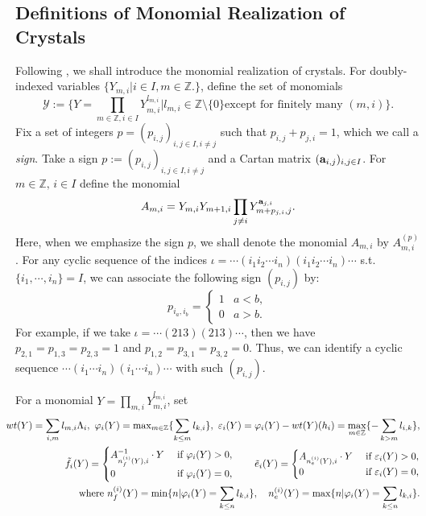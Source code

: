 \subsection{Definitions of Monomial Realization of Crystals}
\label{mono-subsec}
Following \cite{K7,Nj}, 
we shall introduce the monomial realization of crystals.
For doubly-indexed variables $\{Y_{m,i}|i\in I, m\in{\mathbb Z}.\}$, 
define the set of monomials
\[
 {{\mathcal Y}}:=\{Y=\prod_{m\in{\mathbb Z},i\in I}
Y_{m,i}^{l_{m,i}}|l_{m,i}\in {\mathbb Z}\setminus\{0\}\text{
 except for finitely many }(m,i)\}.
\]
Fix a set of integers $p=(p_{i,j})_{i,j\in I,i\ne j}$ such that 
$p_{i,j}+p_{j,i}=1$, which we call a {\it sign}. 
Take a sign $p:=(p_{i,j})_{i,j\in I,i\ne j}$ and a
Cartan matrix $({\bf a}_{i,j})_{i,j\in I}$. For $m\in{\mathbb Z},\,i\in I$ 
define the monomial 
\[
 A_{m,i}=Y_{m,i}Y_{m+1,i}\prod_{j\ne i}Y_{m+p_{j,i},j}^{{\bf a}_{j,i}}.
\]
Here, when we emphasize the sign $p$, we shall denote the
monomial
$A_{m,i}$ by $A^{(p)}_{m,i}$.
For any cyclic sequence of the indices
${\iota}={\cdots} (i_1i_2{\cdots} i_n)(i_1i_2{\cdots} i_n){\cdots}$
s.t. $\{i_1,{\cdots},i_n\}=I$,
we can associate the following sign $(p_{i,j})$ by:
\begin{equation}
 p_{i_a,i_b}=\begin{cases}
1&a<b,\\0&a>b.\end{cases}
\label{iaib}
\end{equation}
For example, if we take ${\iota}={\cdots} (213)(213){\cdots}$, then we have
$p_{2,1}=p_{1,3}=p_{2,3}=1$ and $p_{1,2}=p_{3,1}=p_{3,2}=0$.
Thus, we can identify a cyclic sequence ${\cdots}(i_1{\cdots} i_n)(i_1{\cdots} i_n){\cdots}$ 
with such $(p_{i,j})$.

For a monomial $Y=\prod_{m,i}Y_{m,i}^{l_{m,i}}$, 
set 
\begin{eqnarray*}
&&\hspace{-20pt}wt(Y)=\sum_{i,m} l_{m,i}{\Lambda}_i, \,\,
{\varphi}_i(Y)=\operatorname{max}_{m\in{\mathbb Z}}\{\sum_{k\leq m}l_{k,i}\},\,\,
{\varepsilon}_i(Y)={\varphi}_i(Y)-wt(Y)(h_i)
=\max_{m\in{\mathbb Z}}\{-\sum_{k>m}l_{i,k}\},\\
&&\hspace{-20pt}{\tilde{f}_i}(Y)=\begin{cases}
A_{n_f^{(i)}(Y),i}^{-1}\cdot Y&\text{ if }{\varphi}_i(Y)>0,\\
0&\text{ if }{\varphi}_i(Y)=0,
\end{cases}{\quad}{\quad}
{\tilde{e}_i}(Y)=\begin{cases}
A_{n_e^{(i)}(Y),i}\cdot Y&\text{ if }{\varepsilon}_i(Y)>0,\\
0&\text{ if }{\varepsilon}_i(Y)=0,
\end{cases}\\
&&\text{where }n_f^{(i)}(Y)=\min\{n|{\varphi}_i(Y)=\sum_{k\leq n}l_{k,i}\},{\quad}
n_e^{(i)}(Y)=\max\{n|{\varphi}_i(Y)=\sum_{k\leq n}l_{k,i}\}.
\end{eqnarray*}

